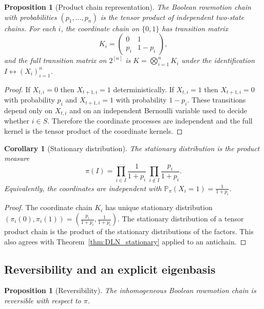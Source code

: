 \documentclass[final,3p,times]{elsarticle}
\newtheorem{proposition}[theorem]{Proposition}
\newtheorem{corollary}[theorem]{Corollary}
\theoremstyle{definition}
\newcommand{\PP}{\mathbb{P}}
\begin{document}
\begin{proposition}[Product chain representation]\label{prop:boolean_product}
The Boolean rowmotion chain with probabilities $(p_1,\dots,p_n)$ is the tensor product of independent two-state chains.
For each $i$, the coordinate chain on $\{0,1\}$ has transition matrix
\[
K_i=\begin{pmatrix}
0 & 1\\
p_i & 1-p_i
\end{pmatrix},
\]
and the full transition matrix on $2^{[n]}$ is $K=\bigotimes_{i=1}^n K_i$ under the identification $I\leftrightarrow (X_{i})_{i=1}^n$.
\end{proposition}

\begin{proof}
If $X_{t,i}=0$ then $X_{t+1,i}=1$ deterministically.
If $X_{t,i}=1$ then $X_{t+1,i}=0$ with probability $p_i$ and $X_{t+1,i}=1$ with probability $1-p_i$.
These transitions depend only on $X_{t,i}$ and on an independent Bernoulli variable used to decide whether $i\in S$.
Therefore the coordinate processes are independent and the full kernel is the tensor product of the coordinate kernels.
\end{proof}

\begin{corollary}[Stationary distribution]\label{cor:boolean_stationary}
The stationary distribution is the product measure
\[
\pi(I)=\prod_{i\in I}\frac{1}{1+p_i}\ \prod_{i\notin I}\frac{p_i}{1+p_i}.
\]
Equivalently, the coordinates are independent with $\PP_\pi(X_i=1)=\frac{1}{1+p_i}$.
\end{corollary}

\begin{proof}
The coordinate chain $K_i$ has unique stationary distribution $(\pi_i(0),\pi_i(1))=(\frac{p_i}{1+p_i},\frac{1}{1+p_i})$.
The stationary distribution of a tensor product chain is the product of the stationary distributions of the factors.
This also agrees with Theorem~\ref{thm:DLN_stationary} applied to an antichain.
\end{proof}

\subsection{Reversibility and an explicit eigenbasis}

\begin{proposition}[Reversibility]\label{prop:boolean_reversible}
The inhomogeneous Boolean rowmotion chain is reversible with respect to $\pi$.
\end{proposition}
\end{document}
